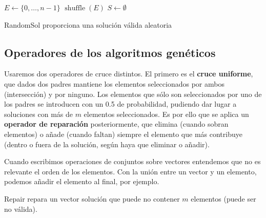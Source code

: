 \documentclass{article}
\begin{document}
\begin{algorithm}[H]
	\DontPrintSemicolon %
	$E \gets \{0,\ldots, n-1\}$ 
	$\operatorname{shuffle}(E)$\;
	$S \gets \emptyset$ 
	\;
	\caption{{\sc RandomSol} proporciona una solución válida aleatoria}
	\label{alg:randomsol}
\end{algorithm}

\subsection{Operadores de los algoritmos genéticos}

Usaremos dos operadores de cruce distintos. El primero es el \textbf{cruce uniforme}, que dados dos padres mantiene los elementos
seleccionados por ambos (intersección) y por ninguno. Los elementos que sólo son seleccionados por uno de los padres se introducen
con un 0.5 de probabilidad, pudiendo dar lugar a soluciones con más de $m$ elementos seleccionados. Es por ello que se aplica un
\textbf{operador de reparación} posteriormente, que elimina (cuando sobran elementos) o añade (cuando faltan) siempre el elemento
que más contribuye (dentro o fuera de la solución, según haya que eliminar o añadir).

Cuando escribimos operaciones de conjuntos sobre vectores entendemos que no es relevante el orden
de los elementos. Con la unión entre un vector y un elemento, podemos añadir el elemento al final, por ejemplo.

\begin{algorithm}[H]
	\DontPrintSemicolon %
	\caption{{\sc Repair} repara un vector solución que puede no contener $m$ elementos (puede ser no válida).}
	\label{alg:reparacion}
\end{algorithm}
\end{document}
